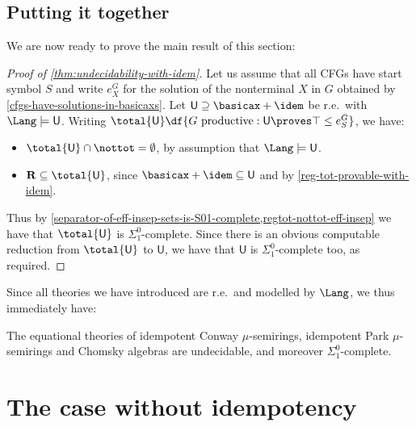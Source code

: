 \documentclass[runningheads]{amsart}
\begin{document}
\subsection{Putting it together}
We are now ready to prove the main result of this section:

\begin{proof}
    [Proof of \cref{thm:undecidability-with-idem}]
    Let us assume that all CFGs have start symbol $S$ and write $e^G_X$ for the solution of the nonterminal $X$ in $G$ obtained by \cref{cfgs-have-solutions-in-basicaxs}.
    Let $\mathsf U \supseteq \basicax+\idem$ be r.e.\ with $\Lang \models \mathsf U$.  
    Writing $\total {\mathsf U} \df \{G \text{ productive} : \mathsf U \proves \top \leq e^G_S \}$,
    we have:
    \begin{itemize}
        \item $\total {\mathsf U}  \cap \nottot = \emptyset$, by assumption that $\Lang \models \mathsf U$.
        \item $\mathbf R \subseteq \total {\mathsf U}  $, since $\basicax+\idem \subseteq \mathsf U$ and by \cref{reg-tot-provable-with-idem}.
    \end{itemize}
    Thus by \cref{separator-of-eff-insep-sets-is-S01-complete,regtot-nottot-eff-insep} we have that $\total {\mathsf U}$ is $\Sigma^0_1$-complete.
    Since there is an obvious computable reduction from $\total {\mathsf U}$ to $\mathsf U$, we have that $\mathsf U$ is $\Sigma^0_1$-complete too, as required.
\end{proof}


Since all theories we have introduced are r.e.\ and modelled by $\Lang$, we thus immediately have:
\begin{corollary}
    The equational theories of idempotent Conway $\mu$-semirings, idempotent Park $\mu$-semirings and Chomsky algebras are undecidable, and moreover $\Sigma^0_1$-complete.
\end{corollary}

\section{The case without idempotency}
\label{sec:undec-without-idem}
\end{document}
